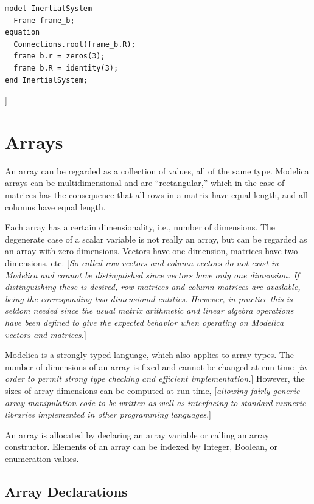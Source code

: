 \documentclass[10pt,a4paper]{report}
\def\doublelabel#1{\label{#1}}
\begin{document}
\begin{lstlisting}[language=modelica]
model InertialSystem
  Frame frame_b;
equation
  Connections.root(frame_b.R);
  frame_b.r = zeros(3);
  frame_b.R = identity(3);
end InertialSystem;
\end{lstlisting}
{]}

\chapter{Arrays}\doublelabel{arrays}

An array can be regarded as a collection of values, all of the same
type. Modelica arrays can be multidimensional and are ``rectangular,''
which in the case of matrices has the consequence that all rows in a
matrix have equal length, and all columns have equal length.

Each array has a certain dimensionality, i.e., number of dimensions. The
degenerate case of a scalar variable is not really an array, but can be
regarded as an array with zero dimensions. Vectors have one dimension,
matrices have two dimensions, etc. {[}\emph{So-called row vectors and
column vectors do not exist in Modelica and cannot be distinguished
since vectors have only one dimension. If distinguishing these is
desired, row matrices and column matrices are available, being the
corresponding two-dimensional entities. However, in practice this is
seldom needed since the usual matrix arithmetic and linear algebra
operations have been defined to give the expected behavior when
operating on Modelica vectors and matrices.}{]}

Modelica is a strongly typed language, which also applies to array
types. The number of dimensions of an array is fixed and cannot be
changed at run-time {[}\emph{in order to permit strong type checking and
efficient implementation.}{]} However, the sizes of array dimensions can
be computed at run-time, {[}\emph{allowing fairly generic array
manipulation code to be written as well as interfacing to standard
numeric libraries implemented in other programming languages}.{]}

An array is allocated by declaring an array variable or calling an array
constructor. Elements of an array can be indexed by Integer, Boolean, or
enumeration values.

\section{Array Declarations}\doublelabel{array-declarations}
\end{document}
